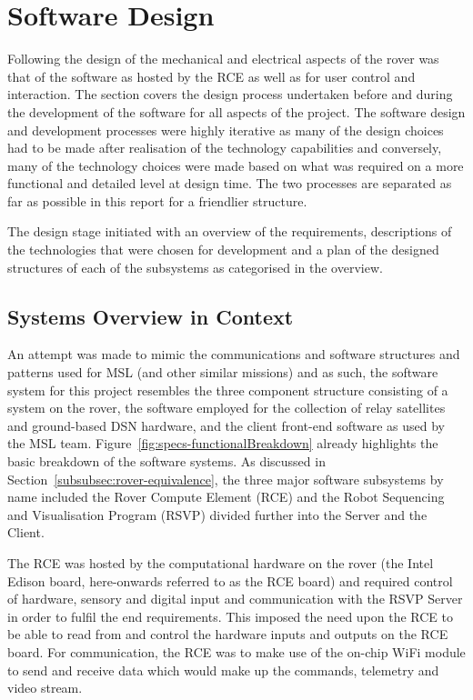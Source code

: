 \section{Software Design}
\label{sec:softwareDesign}
  Following the design of the mechanical and electrical aspects of the rover was that of the software as hosted by the RCE as well as for user control and interaction. The section covers the design process undertaken before and during the development of the software for all aspects of the project. The software design and development processes were highly iterative as many of the design choices had to be made after realisation of the technology capabilities and conversely, many of the technology choices were made based on what was required on a more functional and detailed level at design time. The two processes are separated as far as possible in this report for a friendlier structure.
  
  The design stage initiated with an overview of the requirements, descriptions of the technologies that were chosen for development and a plan of the designed structures of each of the subsystems as categorised in the overview.
  
  \subsection{Systems Overview in Context}
    An attempt was made to mimic the communications and software structures and patterns used for MSL (and other similar missions) and as such, the software system for this project resembles the three component structure consisting of a system on the rover, the software employed for the collection of relay satellites and ground-based DSN hardware, and the client front-end software as used by the MSL team. Figure~\ref{fig:specs-functionalBreakdown} already highlights the basic breakdown of the software systems. As discussed in Section~\ref{subsubsec:rover-equivalence}, the three major software subsystems by name included the Rover Compute Element (RCE) and the Robot Sequencing and Visualisation Program (RSVP) divided further into the Server and the Client.
    
    The RCE was hosted by the computational hardware on the rover (the Intel Edison board, here-onwards referred to as the RCE board) and required control of hardware, sensory and digital input and communication with the RSVP Server in order to fulfil the end requirements. This imposed the need upon the RCE to be able to read from and control the hardware inputs and outputs on the RCE board. For communication, the RCE was to make use of the on-chip WiFi module to send and receive data which would make up the commands, telemetry and video stream.
    
